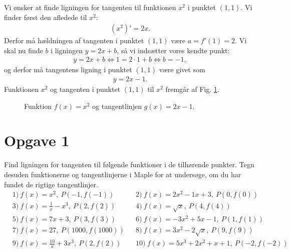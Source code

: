 \begin{exa}
Vi ønsker at finde ligningen for tangenten til funktionen $x^2$ i punktet $(1,1)$. Vi finder først den afledede til $x^2$:
\begin{align*}
(x^2)' = 2x.
\end{align*}
Derfor må hældningen af tangenten i punktet $(1,1)$ være $a = f'(1) = 2$. Vi skal nu finde $b$ i ligningen $y=2x+b$, så vi indsætter vores kendte punkt:
\begin{align*}
y = 2x+b \Leftrightarrow 1= 2\cdot 1 +b \Leftrightarrow b = -1,
\end{align*}
og derfor må tangentens ligning i punktet $(1,1)$ være givet som
\begin{align*}
y = 2x-1.
\end{align*}
Funktionen $x^2$ og tangenten i punktet $(1,1)$ til $x^2$ fremgår af Fig. \ref{fig:tangent}.

\begin{figure}[H]
	\centering
	\caption{Funktion $f(x)=x^2$ og tangentlinjen $g(x) = 2x-1$.}
	\label{fig:tangent}
\end{figure}
\end{exa}


\section*{Opgave 1}
Find ligningen for tangenten til følgende funktioner i de tilhørende punkter. Tegn desuden funktionerne og tangentlinjerne i Maple for at undersøge, om du har fundet de rigtige tangentlinjer. 
\begin{align*}
&1) \ f(x) = x^2,\  P(-1,f(-1))  &&2) \   f(x)=2x^2-1x+3, \ P(0,f(0))    \\
&3) \ f(x) = \frac{1}{x} -x^3, \ P(2,f(2))   &&4) \ f(x) = \sqrt{x}, \ P(4,f(4))    \\
&5) \ f(x) = 7x+3,\ P(3,f(3))   &&6) \ f(x) = -3x^2+5x-1, \ P(1,f(1))     \\
&7) \ f(x) = 27, \ P(1000,f(1000))   &&8) \ f(x) = 3x^2-2\sqrt{x}, \ P(9,f(9))     \\
&9) \ f(x) = \frac{10}{x}+3x^3, \ P(2,f(2))   &&10) \ f(x) = 5x^3+2x^2+x+1, \ P(-2,f(-2))     \\
\end{align*}
